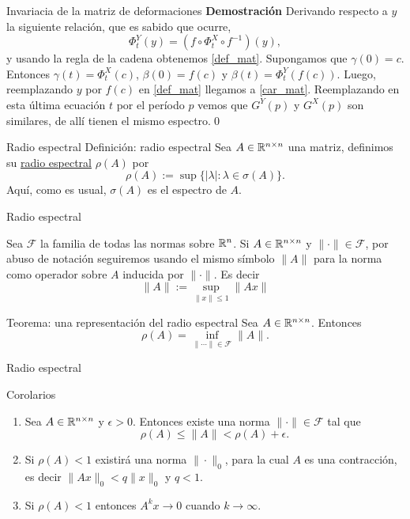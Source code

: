  

   {Invariacia de la matriz de deformaciones}
\textbf{Demostración} Derivando respecto a $y$ la siguiente relación, que es sabido que ocurre,
\[\Phi_t^Y(y)=(f\circ \Phi^X_t\circ f^{-1})(y),\]
y usando la regla de la cadena obtenemos \eqref{def_mat}. Supongamos que $\gamma(0)=c$. Entonces $\gamma(t)=\Phi^X_t(c)$, $\beta(0)=f(c)$ y $\beta(t)=\Phi_t^Y(f(c))$. 
Luego, reemplazando $y$ por $f(c)$ en \eqref{def_mat} llegamos a  \eqref{car_mat}.  Reemplazando en esta última ecuación $t$ por el período $p$ vemos que $G^Y(p)$ y $G^X(p)$
son similares, de allí tienen el mismo espectro.\qed

 
 
 
{Radio espectral}
{Definición: radio espectral} Sea $A\in\mathbb{R}^{n\times n}$ una matriz, definimos su 
\href{http://es.wikipedia.org/wiki/Radio_espectral}{radio espectral} $\rho(A)$ por
\[
\rho(A):= \sup\{|\lambda|: \lambda\in\sigma(A)\}.
\]
Aquí, como es usual, $\sigma(A)$ es el espectro de $A$.





{Radio espectral}


Sea $\mathcal{F}$ la familia de todas las normas sobre $\mathbb{R}^n$. Si $A\in\mathbb{R}^{n\times n}$ y $\|\cdot \|\in\mathcal{F}$, 
por abuso de notación seguiremos usando el mismo símbolo $\|A\|$ para la norma como operador sobre $A$ inducida por 
$\|\cdot\|$. Es decir
\[\|A\|:=\sup_{\|x\|\leq 1} \|Ax\|\]



{Teorema: una representación del radio espectral}
  Sea $A\in\mathbb{R}^{n\times n}$. Entonces
\[  \rho(A)=\inf_{\|\cdots\|\in\mathcal{F}}\|A \|. \]







{Radio espectral}

{Corolarios}
\begin{enumerate}
 \item Sea $A\in\mathbb{R}^{n\times n}$ y $\epsilon>0$. Entonces existe una norma $\| \cdot\|\in\mathcal{F}$ tal que
\[  \rho(A)\leq \|A\|<\rho(A)+\epsilon.\]
\item Si $\rho(A)<1$ existirá una norma $\|\cdot\|_0$, para la cual $A$ es una contracción, es decir $\|Ax\|_0<q\|x\|_0$ y $q<1$. 

\item Si $\rho(A)<1$ entonces $A^kx\to 0$ cuando $k\to\infty$.
\end{enumerate}



